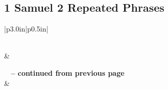 \subsection{1 Samuel 2 Repeated Phrases}


\normalsize
 
\begin{center}
\begin{longtable}{|p{3.0in}|p{0.5in}|}
\caption[1 Samuel 2 Repeated Phrases]{1 Samuel 2 Repeated Phrases}\label{table:Repeated Phrases 1 Samuel 2} \\
\hline {} &  \\ \hline 
\endfirsthead
 
{{\bfseries \tablename\ \thetable{} -- continued from previous page}} \\  
\hline {} &  \\ \hline 
\endhead
 

\end{longtable}
\end{center}
